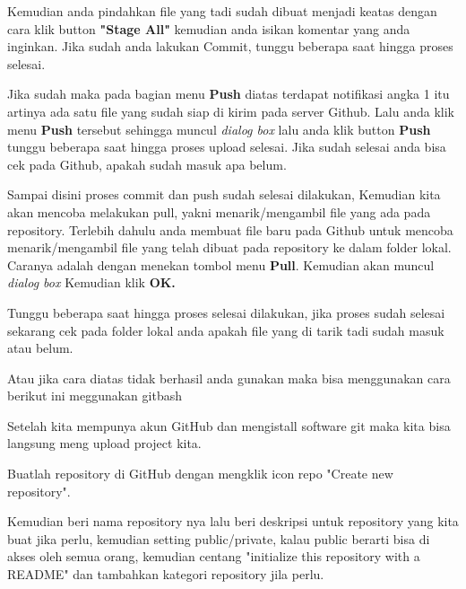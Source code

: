 \vspace{12pt}
\noindent 
Kemudian anda pindahkan file yang tadi sudah dibuat menjadi keatas dengan cara klik button \textbf{"Stage All"} $  $kemudian anda isikan komentar yang anda inginkan. Jika sudah anda lakukan Commit, tunggu beberapa saat hingga proses selesai. \par
\vspace{12pt}
\noindent 
Jika sudah maka pada bagian menu \textbf{Push }diatas terdapat notifikasi angka 1 itu artinya ada satu file yang sudah siap di kirim pada server Github. Lalu anda klik menu \textbf{Push} $  $tersebut sehingga muncul \textit{dialog box }lalu anda klik button \textbf{Push} $  $tunggu beberapa saat hingga proses upload selesai. Jika sudah selesai anda bisa cek pada Github, apakah sudah masuk apa belum. \par
\vspace{12pt}
\noindent 
Sampai disini proses commit dan push sudah selesai dilakukan, Kemudian kita akan mencoba melakukan pull, yakni menarik/mengambil file yang ada pada repository. Terlebih dahulu anda membuat file baru pada Github untuk mencoba menarik/mengambil file yang telah dibuat pada repository ke dalam folder lokal. Caranya adalah dengan menekan tombol menu \textbf{Pull}. Kemudian akan muncul \textit{dialog box} Kemudian klik \textbf{OK.} \par
\vspace{12pt}
\noindent 
Tunggu beberapa saat hingga proses selesai dilakukan, jika proses sudah selesai sekarang cek pada folder lokal anda apakah file yang di tarik tadi sudah masuk atau belum. \par
\vspace{12pt}
\vspace{12pt}
\noindent 
Atau jika cara diatas tidak berhasil anda gunakan maka bisa menggunakan cara berikut ini meggunakan gitbash \par
\vspace{12pt}
\noindent 
Setelah kita mempunya akun GitHub dan mengistall software git maka kita bisa langsung meng upload project kita. \par
\noindent 
Buatlah repository di GitHub dengan mengklik icon repo "Create new repository". \par
\noindent 
Kemudian beri nama repository nya lalu beri deskripsi untuk repository yang kita buat jika perlu, kemudian setting public/private, kalau public berarti bisa di akses oleh semua orang, kemudian centang "initialize this repository with a README" dan tambahkan kategori repository jila perlu. \par

